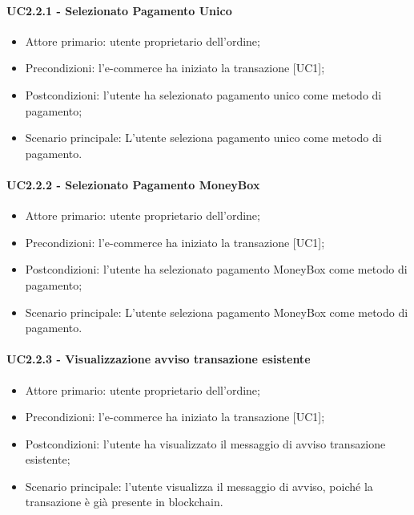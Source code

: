 \paragraph{UC2.2.1 - Selezionato Pagamento Unico}\label{sssec: UC2.2.1}

\begin{itemize}
    \item Attore primario: utente proprietario dell'ordine;
    \item Precondizioni: l'e-commerce\glo{} ha iniziato la transazione [UC1];
    \item Postcondizioni: l'utente ha selezionato pagamento unico come metodo di pagamento;
    \item Scenario principale: L'utente seleziona pagamento unico come metodo di pagamento.
\end{itemize}

\paragraph{UC2.2.2 - Selezionato Pagamento MoneyBox}

\begin{itemize}
    \item Attore primario: utente proprietario dell'ordine;
    \item Precondizioni: l'e-commerce\glo{} ha iniziato la transazione [UC1];
    \item Postcondizioni: l'utente ha selezionato pagamento MoneyBox\glo{} come metodo di pagamento;
    \item Scenario principale: L'utente seleziona pagamento MoneyBox\glo{} come metodo di pagamento.
\end{itemize}

\paragraph{UC2.2.3 - Visualizzazione avviso transazione esistente}

\begin{itemize}
    \item Attore primario: utente proprietario dell'ordine;
    \item Precondizioni: l'e-commerce\glo{} ha iniziato la transazione [UC1];
    \item Postcondizioni: l'utente ha visualizzato il messaggio di avviso transazione esistente;
    \item Scenario principale: l'utente visualizza il messaggio di avviso, poiché la transazione è già presente in blockchain.
\end{itemize}

